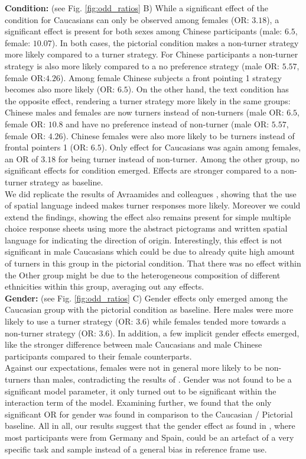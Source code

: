 \documentclass{frontiersSCNS} %
\begin{document}
\textbf{Condition:} (see Fig. \ref{fig:odd_ratios} B)
While a significant effect of the condition for Caucasians can only be observed among females (OR: $3.18$), a significant effect is present for both sexes among Chinese participants (male: $6.5$, female: $10.07$). In both cases, the pictorial condition makes a non-turner strategy more likely compared to a turner strategy. For Chinese participants a non-turner strategy is also more likely compared to a no preference strategy (male OR: $5.57$, female OR:$4.26$). Among female Chinese subjects a front pointing 1 strategy becomes also more likely (OR: $6.5$). 
On the other hand, the text condition has the opposite effect, rendering a turner strategy more likely in the same groups: Chinese males and females are now turners instead of non-turners (male OR: $6.5$, female OR: $10.8$ and have no preference instead of non-turner (male OR: $5.57$, female OR: $4.26$). Chinese females were also more likely to be turners instead of frontal pointers 1 (OR: $6.5$). Only effect for Caucasians was again among females, an OR of $3.18$ for being turner instead of non-turner. Among the other group, no significant effects for condition emerged. Effects are stronger compared to a non-turner strategy as baseline.\\
We did replicate the results of Avraamides and colleagues \citep{Avraamides2004}, showing that the use of spatial language indeed makes turner responses more likely. Moreover we could extend the findings, showing the effect also remains present for simple multiple choice response sheets using more the abstract pictograms and written spatial language for indicating the direction of origin. Interestingly, this effect is not significant in male Caucasians which could be due to already quite high amount of turners in this group in the pictorial condition. That there was no effect within the Other group might be due to the heterogeneous composition of different ethnicities within this group, averaging out any effects.
\\


\textbf{Gender:} (see Fig. \ref{fig:odd_ratios} C)
Gender effects only emerged among the Caucasian group with the pictorial condition as baseline. Here males were more likely to use a turner strategy (OR: $3.6$) while females tended more towards a non-turner strategy (OR: $3.6$).
In addition, a few implicit gender effects emerged, like the stronger difference between male Caucasians and male Chinese participants compared to their female counterparts.\\
Against our expectations, females were not in general more likely to be non-turners than males, contradicting the results of \citep{Goeke2013}. Gender was not found to be a significant model parameter, it only turned out to be significant within the interaction term of the model. Examining further, we found that the only significant OR for gender was found in comparison to the Caucasian / Pictorial baseline. All in all, our results suggest that the gender effect as found in \cite{Goeke2013}, where most participants were from Germany and Spain, could be an artefact of a very specific task and sample instead of a general bias in reference frame use.
\\
\end{document}
